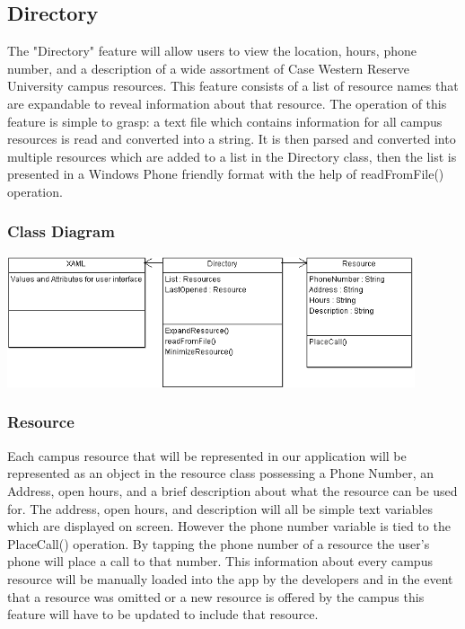 \documentclass[pdftex,12pt,letter]{article}
\begin{document}
\subsection{Directory}
The "Directory" feature will allow users to view the location, hours, phone number, and a description of a wide assortment of Case Western Reserve University campus resources. This feature consists of a list of resource names that are expandable to reveal information about that resource. The operation of this feature is simple to grasp: a text file which contains information for all campus resources is read and converted into a string. It is then parsed and converted into multiple resources which are added to a list in the Directory class, then the list is presented in a Windows Phone friendly format with the help of readFromFile() operation.
\subsubsection{Class Diagram}
\begin{flushleft}
\includegraphics[width=120mm]{DirectoryCD.png}
\end{flushleft}
\subsubsection{Resource}
Each campus resource that will be represented in our application will be represented as an object in the resource class possessing a Phone Number, an Address, open hours, and a brief description about what the resource can be used for. The address, open hours, and description will all be simple text variables which are displayed on screen. However the phone number variable is tied to the PlaceCall() operation. By tapping the phone number of a resource the user’s phone will place a call to that number. This information about every campus resource will be manually loaded into the app by the developers and in the event that a resource was omitted or a new resource is offered by the campus this feature will have to be updated to include that resource. 
\end{document}
